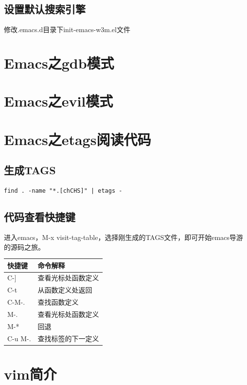 \documentclass[11pt]{article}
\begin{document}
\subsection{设置默认搜索引擎}
\label{sec-8-2}

   修改.emacs.d目录下init-emacs-w3m.el文件
\section{Emacs之gdb模式}
\label{sec-9}
\section{Emacs之evil模式}
\label{sec-10}
\section{Emacs之etags阅读代码}
\label{sec-11}
\subsection{生成TAGS}
\label{sec-11-1}


\begin{verbatim}
find . -name "*.[chCHS]" | etags -
\end{verbatim}
\subsection{代码查看快捷键}
\label{sec-11-2}

   进入emacs，M-x visit-tag-table，选择刚生成的TAGS文件，即可开始emacs导游的源码之旅。

\begin{center}
\begin{tabular}{ll}
 快捷键   &  命令解释            \\
\hline
 C-]      &  查看光标处函数定义  \\
 C-t      &  从函数定义处返回    \\
 C-M-.    &  查找函数定义        \\
 M-.      &  查看光标处函数定义  \\
 M-*      &  回退                \\
 C-u M-.  &  查找标签的下一定义  \\
\end{tabular}
\end{center}
\section{vim简介}
\label{sec-12}
\end{document}
